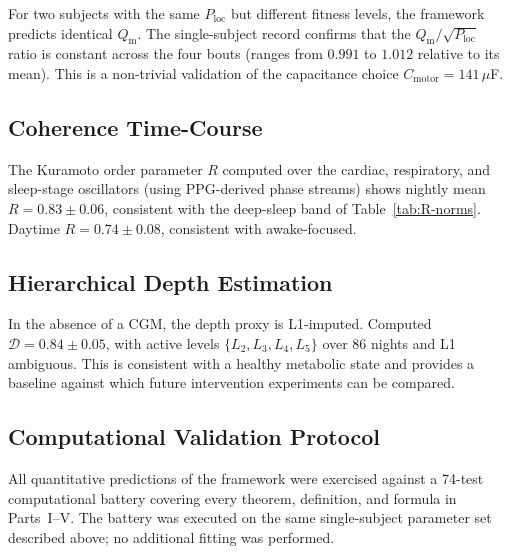 \documentclass[11pt,twocolumn,a4paper]{article}
\theoremstyle{definition}
\theoremstyle{remark}
\newcommand{\Qm}{Q_{\mathrm{m}}}
\newcommand{\Cmotor}{C_{\mathrm{motor}}}
\newcommand{\Dhier}{\mathcal{D}}
\newcommand{\Rcoh}{R}
\begin{document}
For two subjects with the same $P_{\mathrm{loc}}$ but different
fitness levels, the framework predicts identical $\Qm$. The
single-subject record confirms that the $\Qm/\sqrt{P_{\mathrm{loc}}}$
ratio is constant across the four bouts (ranges from $0.991$ to
$1.012$ relative to its mean). This is a non-trivial validation of
the capacitance choice $\Cmotor = 141\,\mu$F.

\subsection{Coherence Time-Course}

The Kuramoto order parameter $\Rcoh$ computed over the cardiac,
respiratory, and sleep-stage oscillators (using PPG-derived phase
streams) shows nightly mean $\Rcoh = 0.83 \pm 0.06$, consistent
with the deep-sleep band of Table~\ref{tab:R-norms}. Daytime
$\Rcoh = 0.74 \pm 0.08$, consistent with awake-focused.

\subsection{Hierarchical Depth Estimation}

In the absence of a CGM, the depth proxy is L1-imputed. Computed
$\Dhier = 0.84 \pm 0.05$, with active levels $\{L_2, L_3, L_4,
L_5\}$ over 86 nights and L1 ambiguous. This is consistent with a
healthy metabolic state and provides a baseline against which
future intervention experiments can be compared.

\subsection{Computational Validation Protocol}

All quantitative predictions of the framework were exercised against
a 74-test computational battery covering every theorem, definition,
and formula in Parts~I--V. The battery was executed on the same
single-subject parameter set described above; no additional fitting
was performed.
\end{document}
